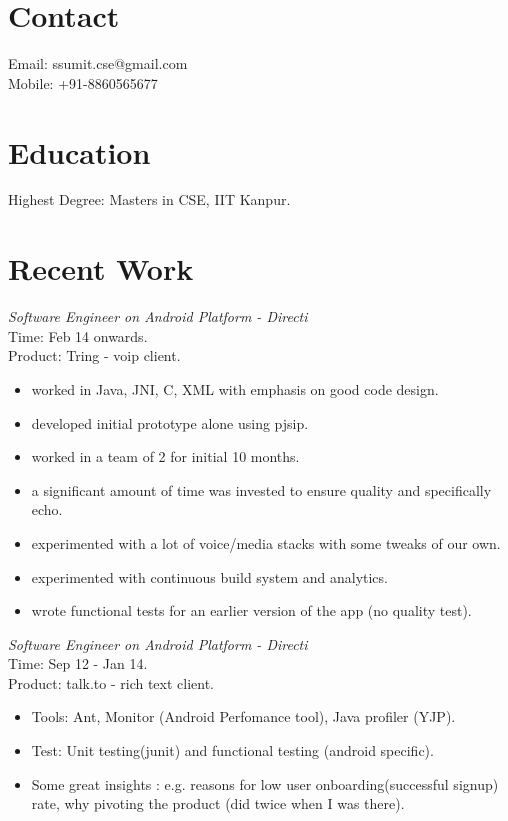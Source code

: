 \documentclass[margin,line]{resume}
\begin{document}
\begin{resume}

    \section{\mysidestyle Contact}
    	Email: ssumit.cse@gmail.com\\
    	Mobile: +91-8860565677
    \section{\mysidestyle Education}
	Highest Degree: Masters in CSE, IIT Kanpur.

    \section{\mysidestyle Recent Work}

\textit{Software Engineer on Android Platform - Directi} \\
Time: Feb 14 onwards.\\
Product: Tring - voip client.\\
\begin{itemize}
	\item worked in Java, JNI, C, XML with emphasis on good code design.
        \item developed initial prototype alone using pjsip.
        \item worked in a team of 2 for initial 10 months.
	\item a significant amount of time was invested to ensure quality and specifically echo.
	\item experimented with a lot of voice/media stacks with some tweaks of our own.
	\item experimented with continuous build system and analytics.
	\item wrote functional tests for an earlier version of the app (no quality test). 
 \end{itemize}

\textit{Software Engineer on Android Platform - Directi} \\
Time: Sep 12 - Jan 14.\\
Product: talk.to - rich text client.\\
\begin{itemize}
\item Tools: Ant, Monitor (Android Perfomance tool), Java profiler (YJP).
\item Test: Unit testing(junit) and functional testing (android specific).
\item Some great insights : e.g. reasons for low user onboarding(successful signup) rate, why pivoting the product (did twice when I was there).
\end{itemize}


\end{resume}
\end{document}
